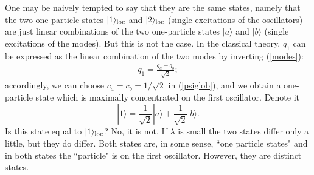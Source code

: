 \documentclass[11pt, nofootinbib]{revtex4-2}
\newcommand{\bea}{\begin{eqnarray}}
\newcommand{\eea}{\end{eqnarray}}
\begin{document}
One may be naively tempted to say that they are the same states,
namely that the two one-particle states $|1\rangle_{\rm loc}$ and
$|2\rangle_{\rm loc}$ (single excitations of the oscillators) are just
linear combinations of the two one-particle states $|a\rangle$ and
$|b\rangle$ (single excitations of the modes).  But this is not the
case.  In the classical theory, $q_{1}$ can be expressed
as the linear combination of the two modes by inverting (\ref{modes}):
%
\bea 
q_1 =\frac{q_{a}+q_{b}}{\sqrt{2}};
\eea
%
accordingly, we can choose $c_{a}=c_{b}=1/\sqrt{2}$ in
(\ref{psiglob}), and we obtain a one-particle state which is maximally
concentrated on the first oscillator. Denote it 
%
\begin{equation} 
|1\rangle= \frac{1}{\sqrt{2}} |a\rangle +
\frac{1}{\sqrt{2}} |b\rangle.
\label{1glo}
\end{equation}
%
Is this state equal to $|1\rangle_{\rm loc}$?  No, it is not.  If
$\lambda$ is small the two states differ only a little, but they do
differ.  Both states are, in some sense, ``one particle states" and in
both states the ``particle" is on the first oscillator.  However, they
are distinct states.  
\end{document}
